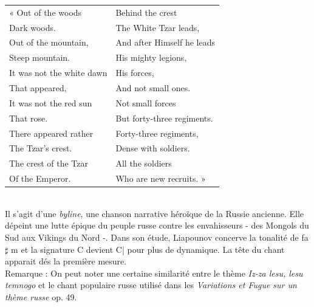 \begin{tabular}{ll}
\hspace{-3.9mm}« Out of the woods
&
Behind the crest
\\
  \quad{}Dark woods.
&
  \quad{}The White Tzar leads,
\\
Out of the mountain,
&
And after Himself he leads
\\
  \quad{}Steep mountain.
&
  \quad{}His mighty legions,
\\
It was not the white dawn
&
His forces,
\\
  \quad{}That appeared,
&
  \quad{}And not small ones.
\\
It was not the red sun
&
Not small forces
\\
  \quad{}That rose.
&
  \quad{}But forty-three regiments.
\\
There appeared rather
&
Forty-three regiments,
\\
  \quad{}The Tzar’s crest.
&
  \quad{}Dense with soldiers.
\\
The crest of the Tzar
&
All the soldiers
\\
  \quad{}Of the Emperor.
&
  \quad{}Who are new recruits. »
\end{tabular}\\

Il s'agit d'une \emph{byline}, une chanson narrative héroïque de la Russie ancienne. Elle dépeint une lutte épique du peuple russe contre les envahisseurs - des Mongols du Sud aux Vikings du Nord -. Dans son étude, Liapounov concerve la tonalité de fa$\sharp$ m et la signature C devient C\hspace{-2mm}| pour plus de dynamique. La tête du chant apparait dés la première mesure.\\

Remarque : On peut noter une certaine similarité entre le thème \emph{Iz-za lesu, lesu temnogo} et le chant populaire russe utilisé dans les \emph{Variations et Fugue sur un thème russe} op. 49.

